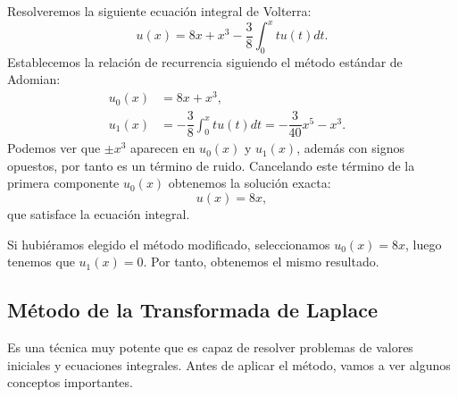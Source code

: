 \begin{ejemplo}
	Resolveremos la siguiente ecuación integral de Volterra:
	\begin{equation}
		u(x) = 8x + x^3 - \dfrac{3}{8} \int_{0}^{x} tu(t)dt.
	\end{equation}
	Establecemos la relación de recurrencia siguiendo el método estándar de Adomian:
	\begin{align}
		u_0(x) &= 8x + x^3,      &   \\
		u_1(x) &= - \dfrac{3}{8} \int_{0}^{x} tu(t)dt = - \dfrac{3}{40}x^5-x^3.    &
	\end{align}
	Podemos ver que $\pm x^3$ aparecen en $u_0(x)$ y $u_1(x)$, además con signos opuestos, por tanto es un término de ruido. Cancelando este término de la primera componente $u_0(x)$ obtenemos la solución exacta:
	\begin{equation}
		u(x) = 8x,
	\end{equation}
	que satisface la ecuación integral.
	\begin{observacion}
		Si hubiéramos elegido el método modificado, seleccionamos $u_0(x) = 8x$, luego tenemos que $u_1(x) = 0$. Por tanto, obtenemos el mismo resultado.
	\end{observacion}
\end{ejemplo}

\subsection{Método de la Transformada de Laplace}
Es una técnica muy potente que es capaz de resolver problemas de valores iniciales y ecuaciones integrales. Antes de aplicar el método, vamos a ver algunos conceptos importantes.


